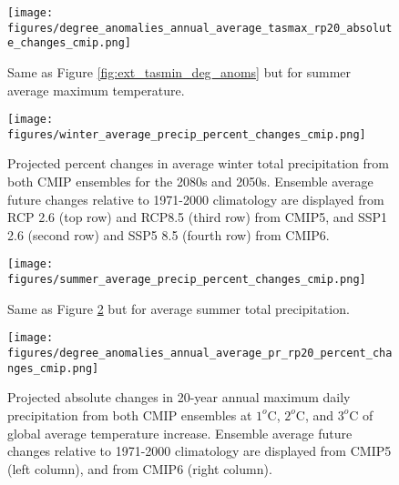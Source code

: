 \documentclass[]{scrartcl}
\begin{document}
\begin{figure}[ht!]
	\centering
	\texttt{[image: figures/degree\_anomalies\_annual\_average\_tasmax\_rp20\_absolute\_changes\_cmip.png]}
	\caption[Tas]{Same as Figure \ref{fig:ext_tasmin_deg_anoms} but for summer average maximum temperature.}
	\label{fig:ext_tasmax_deg_anoms}
\end{figure}

\begin{figure}[ht!]
	\centering
	\texttt{[image: figures/winter\_average\_precip\_percent\_changes\_cmip.png]}
	\caption[Pr]{Projected percent changes in average winter total precipitation from both CMIP ensembles for the 2080s and 2050s. Ensemble average future changes relative to 1971-2000 climatology are displayed from RCP 2.6 (top row) and RCP8.5 (third row) from CMIP5, and SSP1 2.6 (second row) and SSP5 8.5 (fourth row) from CMIP6.}
	\label{fig:win_pr_future}
\end{figure}

\begin{figure}[ht!]
	\centering
	\texttt{[image: figures/summer\_average\_precip\_percent\_changes\_cmip.png]}
	\caption[Pr]{Same as Figure \ref{fig:win_pr_future} but for average summer total precipitation.}
	\label{fig:summer_pr_future}
\end{figure}




\begin{figure}[ht!]
	\centering
	\texttt{[image: figures/degree\_anomalies\_annual\_average\_pr\_rp20\_percent\_changes\_cmip.png]}
	\caption[Pr]{Projected absolute changes in 20-year annual maximum daily precipitation from both CMIP ensembles at $1^o$C, $2^o$C, and $3^o$C of global average temperature increase. Ensemble average future changes relative to 1971-2000 climatology are displayed from CMIP5 (left column), and from CMIP6 (right column).}
	\label{fig:ext_pr20_deg_anoms}
\end{figure}
\end{document}
